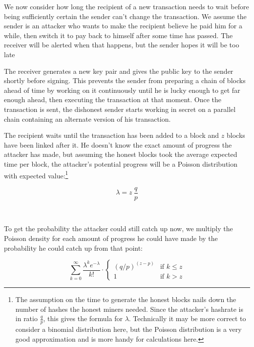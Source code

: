 \documentclass[nohyper]{tufte-handout}
\begin{document}
We now consider how long the recipient of a new transaction needs to
wait before being sufficiently certain the sender can't change the
transaction. We assume the sender is an attacker who wants to make the
recipient believe he paid him for a while, then switch it to pay back to
himself after some time has passed. The receiver will be alerted when
that happens, but the sender hopes it will be too late

The receiver generates a new key pair and gives the public key to the
sender shortly before signing. This prevents the sender from preparing a
chain of blocks ahead of time by working on it continuously until he is
lucky enough to get far enough ahead, then executing the transaction at
that moment. Once the transaction is sent, the dishonest sender starts
working in secret on a parallel chain containing an alternate version of
his transaction.

The recipient waits until the transaction has been added to a block and
$z$ blocks have been linked after it. He doesn't know the exact amount of
progress the attacker has made, but assuming the honest blocks took the
average expected time per block, the attacker's potential progress will
be a Poisson distribution with expected value:\footnote{The assumption on the time to generate the honest blocks nails down the number of hashes the honest miners needed.  Since the attacker's hashrate is in ratio $\frac{q}{p}$, this gives the formula for $\lambda$.  Technically it may be more correct to consider a binomial distribution here, but the Poisson distribution is a very good approximation and is more handy for calculations here.}

\begin{equation}
\lambda = z \ \frac{q}{p}
\end{equation}

\

To get the probability the attacker could still catch up now, we
multiply the Poisson density for each amount of progress he could have
made by the probability he could catch up from that point:

\begin{equation}
\sum _{k=0}^\infty \frac{\lambda ^k e^{-\lambda}}{k!} \cdot 
\begin{cases}
    \left(q/p\right)^{(z-p)} & \text{if } k \leqslant z \\
    1                     & \text{if } k > z
\end{cases}
\end{equation}
\end{document}
